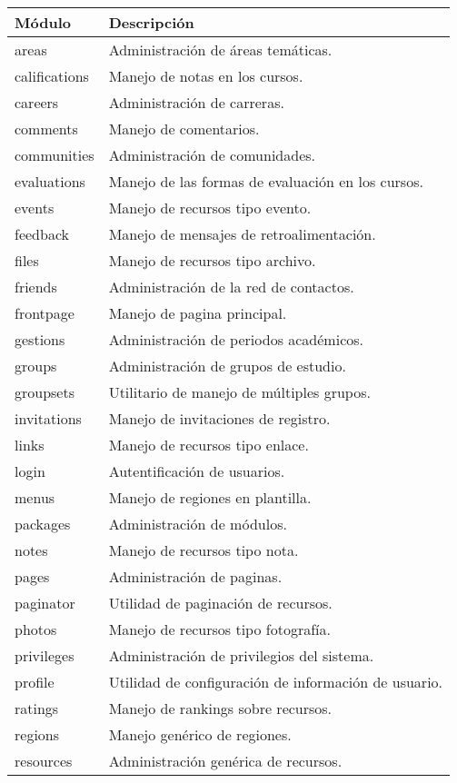 \begin{table}
\begin{tabular}{l|l}
Módulo & Descripción \\
\hline
areas & Administración de áreas temáticas. \\
califications & Manejo de notas en los cursos. \\
careers & Administración de carreras. \\
comments & Manejo de comentarios. \\
communities & Administración de comunidades. \\
evaluations & Manejo de las formas de evaluación en los cursos. \\
events & Manejo de recursos tipo evento. \\
feedback & Manejo de mensajes de retroalimentación. \\
files & Manejo de recursos tipo archivo. \\
friends & Administración de la red de contactos. \\
frontpage & Manejo de pagina principal. \\
gestions & Administración de periodos académicos. \\
groups & Administración de grupos de estudio. \\
groupsets & Utilitario de manejo de múltiples grupos. \\
invitations & Manejo de invitaciones de registro. \\
links & Manejo de recursos tipo enlace. \\
login & Autentificación de usuarios. \\
menus & Manejo de regiones en plantilla. \\
packages & Administración de módulos. \\
notes & Manejo de recursos tipo nota. \\
pages & Administración de paginas. \\
paginator & Utilidad de paginación de recursos. \\
photos & Manejo de recursos tipo fotografía. \\
privileges & Administración de privilegios del sistema. \\
profile & Utilidad de configuración de información de usuario. \\
ratings & Manejo de rankings sobre recursos. \\
regions & Manejo genérico de regiones. \\
resources & Administración genérica de recursos. \\

\end{tabular}
\end{table}
